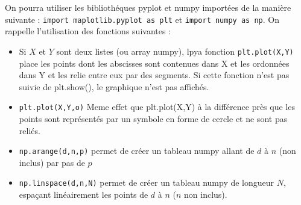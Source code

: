 \begin{probleme}
\begin{enumerate}
 On pourra utiliser les bibliothéques pyplot et numpy importées de la manière suivante : 
\texttt{import maplotlib.pyplot as plt} et \texttt{import numpy as np}.
On rappelle l'utilisation des fonctions suivantes : 
\begin{itemize}
\item  Si $X$ et $Y$ sont deux listes (ou array numpy), lpya fonction \texttt{plt.plot(X,Y)} place les points dont les abscisses sont contenues dans X et les ordonnées dans Y et les relie entre eux par des segments. Si cette fonction n’est pas suivie de plt.show(), le graphique n’est pas affichés. 
\item \texttt{plt.plot(X,Y,o)}  Meme effet que plt.plot(X,Y) à la différence près que les points sont représentés par un symbole en forme de cercle et ne sont pas reliés. 
\item \texttt{np.arange(d,n,p)} permet de créer un tableau numpy allant de $d$ à $n$ (non inclus) par pas de $p$ 
\item \texttt{np.linspace(d,n,N)} permet de créer un tableau numpy de longueur $N$, espaçant linéairement les points de $d$ à $n$ ($n$ non inclus).
\end{itemize}
\end{enumerate}
\end{probleme}



